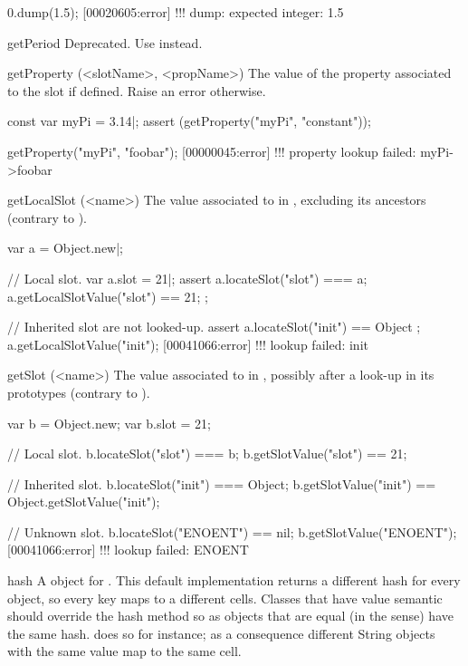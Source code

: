 \begin{urbiscriptapi}
\begin{urbiscript}
0.dump(1.5);
[00020605:error] !!! dump: expected integer: 1.5
\end{urbiscript}

\item[getPeriod]%
  Deprecated.  Use  instead.

\item[getProperty](<slotName>, <propName>)%
  The value of the  property associated to the slot
   if defined.  Raise an error otherwise.
\begin{urbiscript}
const var myPi = 3.14|;
assert (getProperty("myPi", "constant"));

getProperty("myPi", "foobar");
[00000045:error] !!! property lookup failed: myPi->foobar
\end{urbiscript}

\item[getLocalSlot](<name>)%
  The value associated to  in \this, excluding its ancestors
  (contrary to ).
\begin{urbiscript}
var a = Object.new|;

// Local slot.
var a.slot = 21|;
assert
{
  a.locateSlot("slot") === a;
  a.getLocalSlotValue("slot") == 21;
};

// Inherited slot are not looked-up.
assert { a.locateSlot("init") == Object };
a.getLocalSlotValue("init");
[00041066:error] !!! lookup failed: init
\end{urbiscript}

\item[getSlot](<name>)%
  The value associated to  in \this, possibly after a look-up in
  its prototypes (contrary to ).
\begin{urbiassert}
var b = Object.new;
var b.slot = 21;

// Local slot.
b.locateSlot("slot") === b;
b.getSlotValue("slot") == 21;

// Inherited slot.
b.locateSlot("init") === Object;
b.getSlotValue("init") == Object.getSlotValue("init");

// Unknown slot.
b.locateSlot("ENOENT") == nil;
b.getSlotValue("ENOENT");
[00041066:error] !!! lookup failed: ENOENT
\end{urbiassert}

\item[hash]%
  A  object for \this.  This default implementation returns
  a different hash for every object, so every key maps to a different
  cells. Classes that have value semantic should override the hash method so
  as objects that are equal (in the  sense) have the
  same hash.  does so for instance; as a consequence
  different String objects with the same value map to the same cell.


\end{urbiscriptapi}
